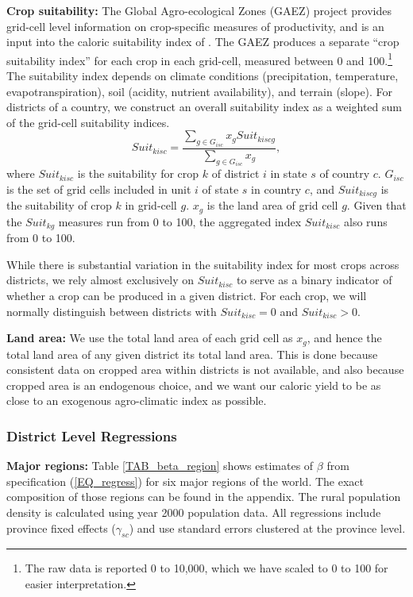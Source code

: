 \documentclass[11pt]{article}
\begin{document}
\vspace{.5cm}\noindent\textbf{Crop suitability:} The Global Agro-ecological Zones (GAEZ) project \citep{gaez} provides grid-cell level information on crop-specific measures of productivity, and is an input into the caloric suitability index of \citet{galorozak2016}. The GAEZ produces a separate ``crop suitability index'' for each crop in each grid-cell, measured between 0 and 100.\footnote{The raw data is reported 0 to 10,000, which we have scaled to 0 to 100 for easier interpretation.} The suitability index depends on climate conditions (precipitation, temperature, evapotranspiration), soil (acidity, nutrient availability), and terrain (slope). For districts of a country, we construct an overall suitability index as a weighted sum of the grid-cell suitability indices.
\begin{equation}
	Suit_{kisc} = \frac{\sum_{g \in G_{isc}} x_g Suit_{kiscg}}{\sum_{g \in G_{isc}} x_g},
\end{equation}
where $Suit_{kisc}$ is the suitability for crop $k$ of district $i$ in state $s$ of country $c$. $G_{isc}$ is the set of grid cells included in unit $i$ of state $s$ in country $c$, and $Suit_{kiscg}$ is the suitability of crop $k$ in grid-cell $g$. $x_g$ is the land area of grid cell $g$. Given that the $Suit_{kg}$ measures run from 0 to 100, the aggregated index $Suit_{kisc}$ also runs from 0 to 100.

While there is substantial variation in the suitability index for most crops across districts, we rely almost exclusively on $Suit_{kisc}$ to serve as a binary indicator of whether a crop can be produced in a given district. For each crop, we will normally distinguish between districts with $Suit_{kisc}=0$ and $Suit_{kisc}>0$. 

\vspace{.5cm}\noindent\textbf{Land area:} We use the total land area of each grid cell as $x_g$, and hence the total land area of any given district its total land area. This is done because consistent data on cropped area within districts is not available, and also because cropped area is an endogenous choice, and we want our caloric yield to be as close to an exogenous agro-climatic index as possible.

\subsubsection{District Level Regressions}

\noindent\textbf{Major regions:} Table \ref{TAB_beta_region} shows estimates of $\beta$ from specification (\ref{EQ_regress}) for six major regions of the world. The exact composition of those regions can be found in the appendix. The rural population density is calculated using year 2000 population data. All regressions include province fixed effects ($\gamma_{sc}$) and use standard errors clustered at the province level.
\end{document}
